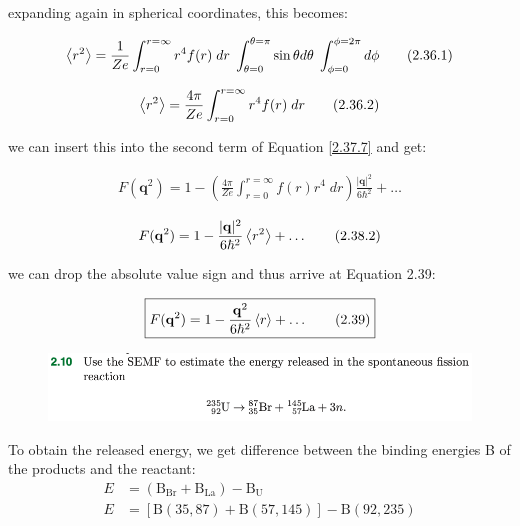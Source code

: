 \documentclass[11pt]{article}
\theoremstyle{definition}
\begin{document}
expanding again in spherical coordinates, this becomes:

\begin{align*}
    \expval{r^2} = \frac{1}{Ze} \int_{r=0}^{r=\infty} r^4 f(r) \; dr \; \int_{\theta=0}^{\theta=\pi} \sin\theta d\theta\;  \int_{\phi=0}^{\phi=2\pi} d\phi\tag{2.36.1}
\end{align*}

\begin{align*}
    \expval{r^2} = \frac{4\pi}{Ze} \int_{r=0}^{r=\infty} r^4 f(r) \; dr \tag{2.36.2}
\end{align*}

we can insert this into the second term of Equation \ref{2.37.7} and get:

\begin{align*}
    F(\mathbf{q}^2) = 
    1
    - 
    \left(\frac{4\pi}{Ze}\int_{r=0}^{r=\infty} f(r)r^4 \; dr \right)\frac{|\mathbf{q}|^2}{6\hbar^2} + \dots
    \tag{2.38.1}\label{2.38.1}
\end{align*}

\begin{align*}
    F(\mathbf{q}^2) = 
    1
    - 
    \frac{|\mathbf{q}|^2}{6\hbar^2}\expval{r^2} + \dots
    \tag{2.38.2}
\end{align*}

we can drop the absolute value sign and thus arrive at Equation 2.39:

\begin{equation*}
    \boxed{
        F(\mathbf{q}^2) = 1 - \frac{\mathbf{q}^2}{6\hbar^2}\expval{r} + \dots \tag{2.39}
    }
\end{equation*}
\newpage
\setcounter{equation}{1}
\begin{figure}[h!]
    \centering
    \includegraphics[scale = 0.45]{2.10.png}
\end{figure}

To obtain the released energy, we get difference between the binding energies B of the products and the reactant:
\begin{align*}
    E &= (\text{B}_{\text{Br}} + \text{B}_{\text{La}}) - \text{B}_{\text{U}} \tag{2.48.1}\\
    E &= [ \text{B}(35,87) + \text{B}(57,145) ] - \text{B}(92,235) \tag{2.48.2}
\end{align*}
\end{document}
